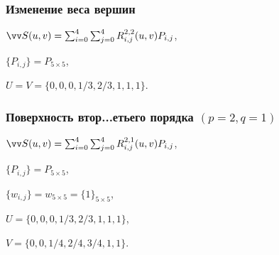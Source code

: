 \documentclass[10pt]{beamer}
\begin{document}
\begin{frame}\frametitle{Изменение веса вершин}
	
	{
	}{
		$\VV S(u,v)=\sum_{i=0}^4\sum_{j=0}^4R_{i,j}^{2,2}(u,v)P_{i,j}$,
		
		$\{P_{i,j}\}=P_{5\times5}$,
		
		
		$U=V=\{0,0,0,1/3,2/3,1,1,1\}$.  
	}
	
\end{frame}



\begin{frame}\frametitle{Поверхность втор...етьего порядка $(p=2, q=1)$}
	
	{
	}{
		$\VV S(u,v)=\sum_{i=0}^4\sum_{j=0}^4R_{i,j}^{2,1}(u,v)P_{i,j}$,
		
		$\{P_{i,j}\}=P_{5\times5}$,
		
		$\{w_{i,j}\}=w_{5\times5}=\{1\}_{5\times5}$,
		
		$U=\{0,0,0,1/3,2/3,1,1,1\}$,
		
		$V=\{0,0,1/4,2/4,3/4,1,1\}$.
	}
	
	
\end{frame}
\end{document}
